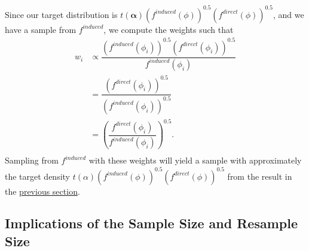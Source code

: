 \documentclass[12pt,twoside]{smiththesis}
\begin{document}
Since our target distribution is \(t(\boldsymbol \alpha) \left( f^{induced} (\phi) \right)^{0.5} \left( f^{direct} (\phi) \right)^{0.5}\), and we have a sample from \(f^{induced}\), we compute the weights such that
\begin{align*} w_i &\propto \dfrac{ \left( f^{induced} (\phi_i) \right)^{0.5} \left( f^{direct} (\phi_i) \right)^{0.5} } {f^{induced}(\phi_i)} \\
&=  \dfrac{ \left( f^{direct} (\phi_i) \right)^{0.5} } {\left( f^{induced} (\phi_i) \right)^{0.5} } \\
&=   \left( \dfrac{  f^{direct} (\phi_i) } { f^{induced} (\phi_i) }  \right)^{0.5}. \\
\end{align*}
Sampling from \(f^{induced}\) with these weights will yield a sample with approximately the target density \(t(\alpha) \left(f^{induced} (\phi) \right)^{0.5} \left( f^{direct} (\phi)\right)^{0.5}\) from the result in the \protect\hyperlink{proof}{previous section}.

\hypertarget{presamp}{%
\subsection{Implications of the Sample Size and Resample Size}\label{presamp}}
\end{document}
